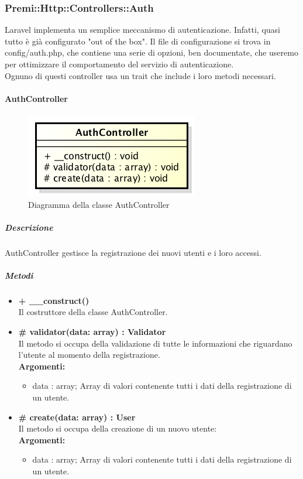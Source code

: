 \newpage
\subsubsection{Premi::Http::Controllers::Auth}
\gls{Laravel} implementa un semplice meccanismo di autenticazione. Infatti, quasi tutto è già configurato "out of the box". Il file di configurazione si trova in config/auth.\gls{php}, che contiene una serie di opzioni, ben documentate, che useremo per ottimizzare il comportamento del servizio di autenticazione.\\
Ognuno di questi controller usa un \gls{trait} che include i loro metodi necessari.
	\paragraph{AuthController}
	\begin{figure}[h]
\centering
\includegraphics[width=0.5\linewidth]{img/back_end_http_controllers_authController}
\caption[Diagramma della classe AuthController]{Diagramma della classe AuthController}
\label{fig:back_end_http_controllers_authController}
\end{figure}
		\subparagraph{Descrizione}
			AuthController gestisce la registrazione dei nuovi utenti e i loro accessi.
		\subparagraph{Metodi}
			\begin{itemize}
				\item \textbf{+ \_\_construct()}\\
				Il costruttore della classe AuthController.
				\item \textbf{\# validator(data: array) : Validator}\\
				Il metodo si occupa della validazione di tutte le informazioni che riguardano l'utente al momento della registrazione.\\
					\textbf{Argomenti:}
						\begin{itemize}
							\item data : array;
							Array di valori contenente tutti i dati della registrazione di un utente. 
						\end{itemize}
				\item \textbf{\# create(data: array) : User}\\
				Il metodo si occupa della creazione di un nuovo utente:\\
					\textbf{Argomenti:}
						\begin{itemize}
							\item data : array;
							Array di valori contenente tutti i dati della registrazione di un utente.
						\end{itemize}
			\end{itemize}
		
